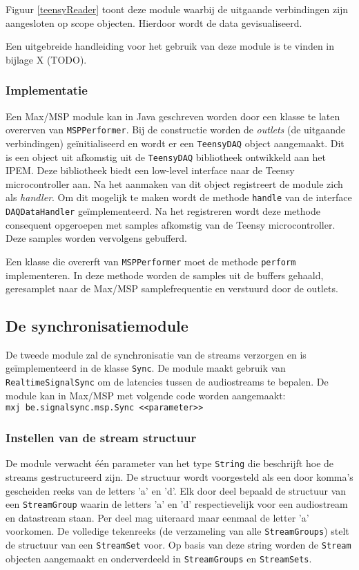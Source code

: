 Figuur \ref{teensyReader} toont deze module waarbij de uitgaande verbindingen zijn aangesloten op scope objecten. Hierdoor wordt de data gevisualiseerd.

Een uitgebreide handleiding voor het gebruik van deze module is te vinden in bijlage X (TODO).

\subsubsection{Implementatie}

Een Max/MSP module kan in Java geschreven worden door een klasse te laten overerven van \texttt{MSPPerformer}. Bij de constructie worden de \textit{outlets} (de uitgaande verbindingen) geïnitialiseerd en wordt er een \texttt{TeensyDAQ} object aangemaakt. Dit is een object uit afkomstig uit de \texttt{TeensyDAQ} bibliotheek ontwikkeld aan het IPEM. Deze bibliotheek biedt een low-level interface naar de Teensy microcontroller aan. Na het aanmaken van dit object registreert de module zich als \textit{handler}. Om dit mogelijk te maken wordt de methode \texttt{handle} van de interface \texttt{DAQDataHandler} geïmplementeerd. Na het registreren wordt deze methode consequent opgeroepen met samples afkomstig van de Teensy microcontroller. Deze samples worden vervolgens gebufferd.

Een klasse die overerft van \texttt{MSPPerformer} moet de methode \texttt{perform} implementeren. In deze methode worden de samples uit de buffers gehaald, geresamplet naar de Max/MSP samplefrequentie en verstuurd door de outlets.

\subsection{De synchronisatiemodule}

De tweede module zal de synchronisatie van de streams verzorgen en is geïmplementeerd in de klasse \texttt{Sync}. De module maakt gebruik van \texttt{RealtimeSignalSync} om de latencies tussen de audiostreams te bepalen. De module kan in Max/MSP met volgende code worden aangemaakt: \texttt{mxj\textapprox\  be.signalsync.msp.Sync <<parameter>>}

\subsubsection{Instellen van de stream structuur}

De module verwacht één parameter van het type \texttt{String} die beschrijft hoe de streams gestructureerd zijn. De structuur wordt voorgesteld als een door komma's gescheiden reeks van de letters 'a' en 'd'. Elk door deel bepaald de structuur van een \texttt{StreamGroup} waarin de letters 'a' en 'd' respectievelijk voor een audiostream en datastream staan. Per deel mag uiteraard maar eenmaal de letter 'a' voorkomen. De volledige tekenreeks  (de verzameling van alle \texttt{StreamGroups}) stelt de structuur van een \texttt{StreamSet} voor. Op basis van deze string worden de \texttt{Stream} objecten aangemaakt en onderverdeeld in \texttt{StreamGroups} en \texttt{StreamSets}.

